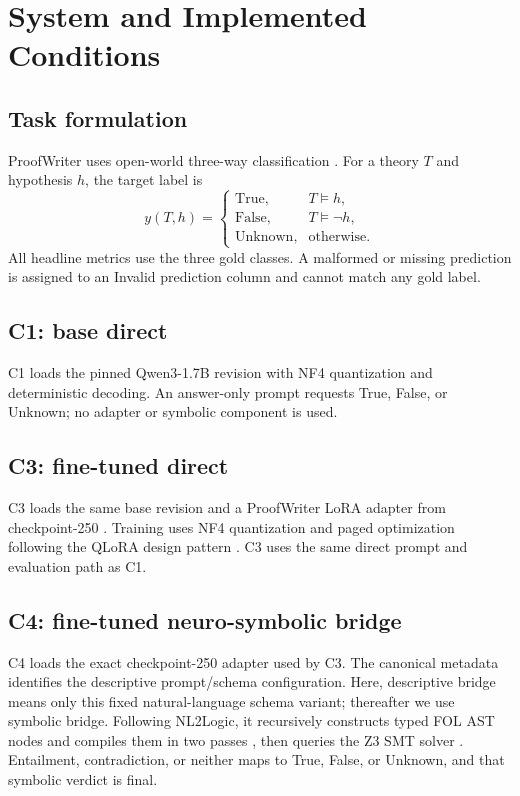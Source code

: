 \documentclass[conference]{IEEEtran}
\begin{document}
\section{System and Implemented Conditions}
\subsection{Task formulation}
ProofWriter uses open-world three-way classification \cite{tafjord2021proofwriter}. For a theory $T$ and hypothesis $h$, the target label is
\begin{equation}
y(T,h)=\begin{cases}
\text{True}, & T\models h,\\
\text{False}, & T\models \neg h,\\
\text{Unknown}, & \text{otherwise}.
\end{cases}
\end{equation}
All headline metrics use the three gold classes. A malformed or missing prediction is assigned to an Invalid prediction column and cannot match any gold label.

\subsection{C1: base direct}
C1 loads the pinned Qwen3-1.7B revision with NF4 quantization \cite{qwen2025qwen3,dettmers2023qlora} and deterministic decoding. An answer-only prompt requests True, False, or Unknown; no adapter or symbolic component is used.

\subsection{C3: fine-tuned direct}
C3 loads the same base revision and a ProofWriter LoRA adapter from checkpoint-250 \cite{tafjord2021proofwriter,hu2021lora}. Training uses NF4 quantization and paged optimization following the QLoRA design pattern \cite{dettmers2023qlora}. C3 uses the same direct prompt and evaluation path as C1.

\subsection{C4: fine-tuned neuro-symbolic bridge}
C4 loads the exact checkpoint-250 adapter used by C3. The canonical metadata identifies the descriptive prompt/schema configuration. Here, descriptive bridge means only this fixed natural-language schema variant; thereafter we use symbolic bridge. Following NL2Logic, it recursively constructs typed FOL AST nodes and compiles them in two passes \cite{putra2026nl2logic}, then queries the Z3 SMT solver \cite{demoura2008z3}. Entailment, contradiction, or neither maps to True, False, or Unknown, and that symbolic verdict is final.
\end{document}
